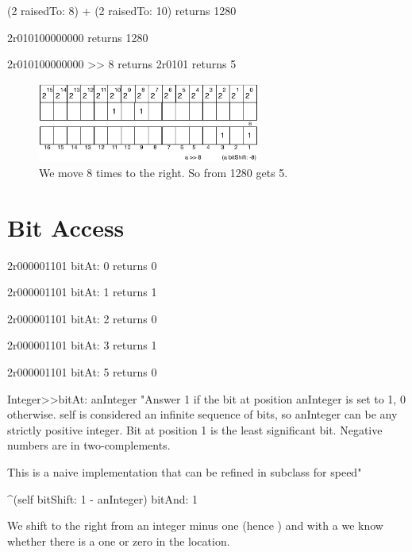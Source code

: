 \documentclass[a4paper,10pt,twoside]{book}
\begin{document}
\begin{code}{}
(2 raisedTo: 8) + (2 raisedTo: 10) 
	returns 1280
	
2r010100000000
	returns 1280
	
2r010100000000 >> 8
	returns	2r0101
	returns 5
\end{code}

\begin{figure}[h]
\begin{center}
\includegraphics[width=0.65\textwidth]{16bits-1280shifted8}
\caption{We move 8 times to the right. So from 1280 gets 5.}
\end{center}
\end{figure}







\section{Bit Access}

\begin{code}{}
2r000001101 bitAt: 0
	returns 0 
	
2r000001101 bitAt: 1
	returns 1 
	
2r000001101 bitAt: 2
	returns 0 
			
2r000001101 bitAt: 3
	returns 1
	 
2r000001101 bitAt: 5
	returns 0 	 
\end{code}


\begin{code}{}
Integer>>bitAt: anInteger
	"Answer 1 if the bit at position anInteger is set to 1, 0 otherwise.
	self is considered an infinite sequence of bits, so anInteger can be any strictly positive integer.
	Bit at position 1 is the least significant bit.
	Negative numbers are in two-complements.
	
	This is a naive implementation that can be refined in subclass for speed"
	
	^(self bitShift: 1 - anInteger) bitAnd: 1
\end{code}

We shift to the right from an integer minus one (hence )
and with a  we know whether there is a one or zero in the location.
\end{document}
